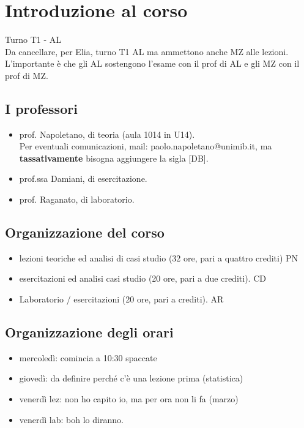 \chapter{Introduzione al corso}
Turno T1 - AL
\\Da cancellare, per Elia, turno T1 AL ma ammettono anche MZ alle lezioni. L'importante è che gli AL sostengono l'esame con il prof di AL e gli MZ con il prof di MZ.
\section{I professori}
\begin{itemize}
    \item prof. Napoletano, di teoria (aula 1014 in U14).
    \\Per eventuali comunicazioni, mail: paolo.napoletano@unimib.it, ma \textbf{tassativamente} bisogna aggiungere la sigla [DB].
    \item prof.ssa Damiani, di esercitazione.
    \item prof. Raganato, di laboratorio.
\end{itemize}

\section{Organizzazione del corso}
\begin{itemize}
    \item lezioni teoriche ed analisi di casi studio (32 ore, pari a quattro crediti) PN 
    \item esercitazioni ed analisi casi studio (20 ore, pari a due crediti). CD 
    \item Laboratorio / esercitazioni (20 ore, pari a crediti). AR
\end{itemize}

\section{Organizzazione degli orari}
\begin{itemize}
    \item mercoledì: comincia a 10:30 spaccate
    \item giovedì: da definire perché c'è una lezione prima (statistica)
    \item venerdì lez: non ho capito io, ma per ora non li fa (marzo)
    \item venerdì lab: boh lo diranno.
\end{itemize}

